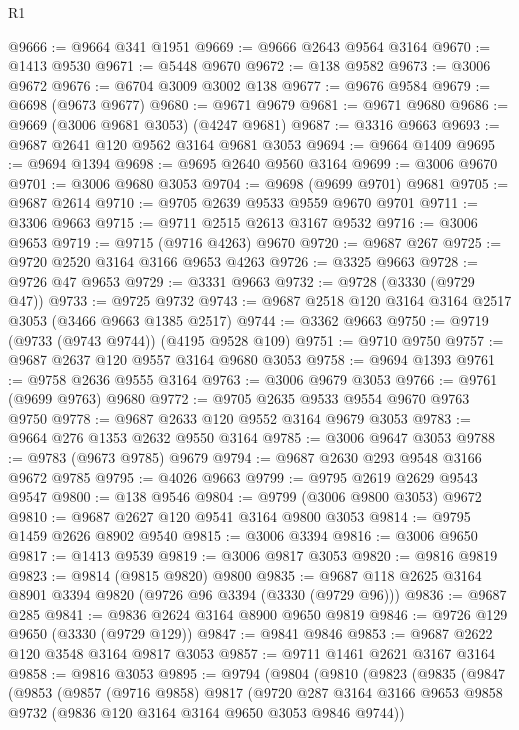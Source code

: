\begin{lexlean}{R1}
\begin{coremodule}
@9666 := @9664 @341 @1951
@9669 := @9666 @2643 @9564 @3164
@9670 := @1413 @9530
@9671 := @5448 @9670
@9672 := @138 @9582
@9673 := @3006 @9672
@9676 := @6704 @3009 @3002 @138
@9677 := @9676 @9584
@9679 := @6698 (@9673 @9677)
@9680 := @9671 @9679
@9681 := @9671 @9680
@9686 := @9669 (@3006 @9681 @3053) (@4247 @9681)
@9687 := @3316 @9663
@9693 := @9687 @2641 @120 @9562 @3164 @9681 @3053
@9694 := @9664 @1409
@9695 := @9694 @1394
@9698 := @9695 @2640 @9560 @3164
@9699 := @3006 @9670
@9701 := @3006 @9680 @3053
@9704 := @9698 (@9699 @9701) @9681
@9705 := @9687 @2614
@9710 := @9705 @2639 @9533 @9559 @9670 @9701
@9711 := @3306 @9663
@9715 := @9711 @2515 @2613 @3167 @9532
@9716 := @3006 @9653
@9719 := @9715 (@9716 @4263) @9670
@9720 := @9687 @267
@9725 := @9720 @2520 @3164 @3166 @9653 @4263
@9726 := @3325 @9663
@9728 := @9726 @47 @9653
@9729 := @3331 @9663
@9732 := @9728 (@3330 (@9729 @47))
@9733 := @9725 @9732
@9743 := @9687 @2518 @120 @3164 @3164 @2517 @3053 (@3466 @9663 @1385 @2517)
@9744 := @3362 @9663
@9750 := @9719 (@9733 (@9743 @9744)) (@4195 @9528 @109)
@9751 := @9710 @9750
@9757 := @9687 @2637 @120 @9557 @3164 @9680 @3053
@9758 := @9694 @1393
@9761 := @9758 @2636 @9555 @3164
@9763 := @3006 @9679 @3053
@9766 := @9761 (@9699 @9763) @9680
@9772 := @9705 @2635 @9533 @9554 @9670 @9763 @9750
@9778 := @9687 @2633 @120 @9552 @3164 @9679 @3053
@9783 := @9664 @276 @1353 @2632 @9550 @3164
@9785 := @3006 @9647 @3053
@9788 := @9783 (@9673 @9785) @9679
@9794 := @9687 @2630 @293 @9548 @3166 @9672 @9785
@9795 := @4026 @9663
@9799 := @9795 @2619 @2629 @9543 @9547
@9800 := @138 @9546
@9804 := @9799 (@3006 @9800 @3053) @9672
@9810 := @9687 @2627 @120 @9541 @3164 @9800 @3053
@9814 := @9795 @1459 @2626 @8902 @9540
@9815 := @3006 @3394
@9816 := @3006 @9650
@9817 := @1413 @9539
@9819 := @3006 @9817 @3053
@9820 := @9816 @9819
@9823 := @9814 (@9815 @9820) @9800
@9835 := @9687 @118 @2625 @3164 @8901 @3394 @9820 (@9726 @96 @3394 (@3330 (@9729 @96)))
@9836 := @9687 @285
@9841 := @9836 @2624 @3164 @8900 @9650 @9819
@9846 := @9726 @129 @9650 (@3330 (@9729 @129))
@9847 := @9841 @9846
@9853 := @9687 @2622 @120 @3548 @3164 @9817 @3053
@9857 := @9711 @1461 @2621 @3167 @3164
@9858 := @9816 @3053
@9895 := @9794
    (@9804
      (@9810
        (@9823
          (@9835
            (@9847
              (@9853
                (@9857
                  (@9716 @9858)
                  @9817
                  (@9720
                    @287
                    @3164
                    @3166
                    @9653
                    @9858
                    @9732
                    (@9836 @120 @3164 @3164 @9650 @3053 @9846 @9744))

\end{coremodule}
\end{lexlean}
